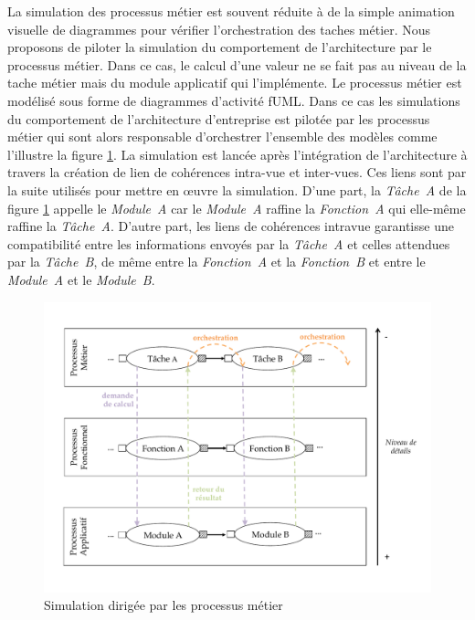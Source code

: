 La simulation des processus métier est souvent réduite à de la simple animation visuelle de diagrammes pour vérifier l'orchestration des taches métier. Nous proposons de piloter la simulation du comportement de l'architecture par le processus métier. Dans ce cas, le calcul d'une valeur ne se fait pas au niveau de la tache métier mais du module applicatif qui l'implémente. Le processus métier est modélisé sous forme de diagrammes d'activité fUML. Dans ce cas les simulations du comportement de l'architecture d'entreprise est pilotée par les processus métier qui sont alors responsable d'orchestrer l'ensemble des modèles comme l'illustre la figure \ref{fig:Simulation_Approche}. La simulation est lancée après l'intégration de l'architecture à travers la création de lien de cohérences intra-vue et inter-vues. Ces liens sont par la suite utilisés pour mettre en œuvre la simulation. D'une part, la \textit{Tâche~A} de la figure \ref{fig:Simulation_Approche} appelle le \textit{Module~A} car le \textit{Module~A} raffine la \textit{Fonction~A} qui elle-même raffine la \textit{Tâche~A}. D'autre part, les liens de cohérences intravue garantisse une compatibilité entre les informations envoyés par la \textit{Tâche~A} et celles attendues par la \textit{Tâche~B}, de même entre la \textit{Fonction~A} et la \textit{Fonction~B} et entre le \textit{Module~A} et le \textit{Module~B}.
\begin{figure}[!htbp]
 \begin{center}
  \includegraphics[trim= 0cm 2cm 0cm 0cm, width=1\textwidth]{images/demarche/approche_simulation.pdf}
 \end{center}
 \caption{Simulation dirigée par les processus métier}
 \label{fig:Simulation_Approche}
\end{figure}

